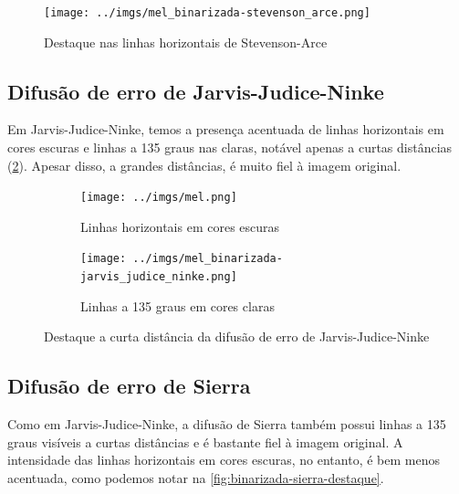 \documentclass[brazilian,a4paper,twocolumn]{article}
\begin{document}
        \begin{figure}
            \centering
            \texttt{[image: ../imgs/mel\_binarizada-stevenson\_arce.png]}
            \caption{Destaque nas linhas horizontais de Stevenson-Arce}
            \label{fig:binarizada-stevenson_arce-destaque}
        \end{figure}


    \subsection{Difusão de erro de Jarvis-Judice-Ninke}

        Em Jarvis-Judice-Ninke, temos a presença acentuada de linhas horizontais em cores escuras e linhas a 135 graus nas claras, notável apenas a curtas distâncias (\cref{fig:binarizada-jarvis_judice_ninke-destaque}). Apesar disso, a grandes distâncias, é muito fiel à imagem original.

        \begin{figure}
            \centering
            \begin{subfigure}{0.24\textwidth}
                \texttt{[image: ../imgs/mel.png]}
                \caption{Linhas horizontais em cores escuras}
            \end{subfigure}
            \begin{subfigure}{0.24\textwidth}
                \texttt{[image: ../imgs/mel\_binarizada-jarvis\_judice\_ninke.png]}
                \caption{Linhas a 135 graus em cores claras}
            \end{subfigure}

            \caption{Destaque a curta distância da difusão de erro de Jarvis-Judice-Ninke}
            \label{fig:binarizada-jarvis_judice_ninke-destaque}
        \end{figure}

    \subsection{Difusão de erro de Sierra}

        Como em Jarvis-Judice-Ninke, a difusão de Sierra também possui linhas a 135 graus visíveis a curtas distâncias e é bastante fiel à imagem original. A intensidade das linhas horizontais em cores escuras, no entanto, é bem menos acentuada, como podemos notar na \cref{fig:binarizada-sierra-destaque}.
\end{document}
